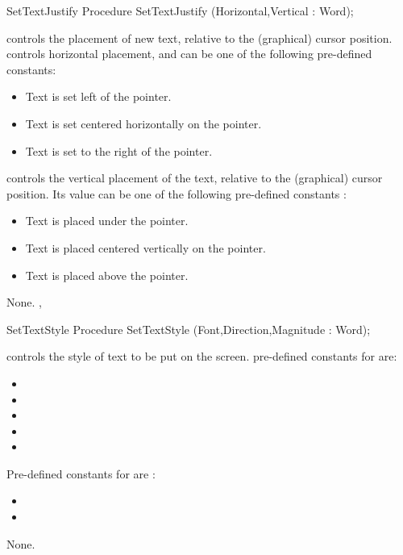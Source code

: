 \begin{procedure}{SetTextJustify}
\Declaration
Procedure SetTextJustify (Horizontal,Vertical : Word);

\Description
{} controls the placement of new text, relative to the 
(graphical) cursor position.  controls horizontal placement, and can be
one of the following pre-defined constants:

\begin{itemize}
\item {} Text is set left of the pointer.
\item {} Text is set centered horizontally on the pointer.
\item {} Text is set to the right of the pointer.
\end{itemize}
 controls the vertical placement of the text, relative to the
(graphical) cursor position. Its value can be one of the following
pre-defined constants :

\begin{itemize}
\item {} Text is placed under the pointer.
\item {} Text is placed centered vertically on the pointer.
\item {}Text is placed above the pointer.
\end{itemize}

\Errors
None.
\SeeAlso
{}, 
\end{procedure}

\begin{procedure}{SetTextStyle}
\Declaration
Procedure SetTextStyle (Font,Direction,Magnitude : Word);

\Description
{} controls the style of text to be put on the screen.
pre-defined constants for  are:

\begin{itemize}
\item {}
\item {}
\item {}
\item {}
\item {}
\end{itemize}
Pre-defined constants for  are :

\begin{itemize}
\item {}
\item {}
\end{itemize}
\Errors
None.
\SeeAlso
{} 
\end{procedure}

